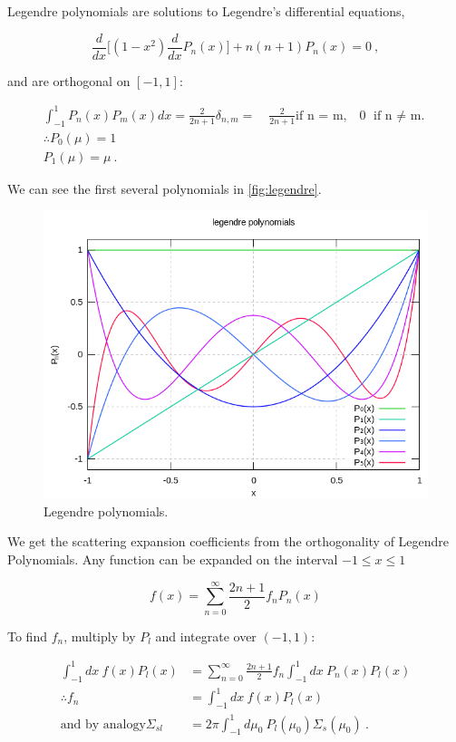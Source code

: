 \documentclass[12pt]{article}
\begin{document}
Legendre polynomials are solutions to Legendre's differential equations,

\[\frac{d}{dx}\bigl[(1 - x^2) \frac{d}{dx} P_n(x) \bigr] +
n(n+1)P_n(x) = 0\:,\]

and are orthogonal on $[-1,1]$:

\begin{gather*}
\int_{-1}^{1}P_n(x)P_m(x)dx = 
\frac{2}{2n+1}\delta_{n,m}= \quad\frac{2}{2n+1}\text{if n = m,} 
\quad 0\text{ if n $\neq$ m.}\\
\therefore P_0(\mu) = 1 \\
P_1(\mu) = \mu\:.
\end{gather*}

We can see the first several polynomials in \autoref{fig:legendre}.

\begin{figure}[h!]
    \begin{center}
    \includegraphics[keepaspectratio, width = 3.5 in]{Legendrepolynomials}
    \end{center}
    \caption{Legendre polynomials.}
    \label{fig:legendre}
\end{figure}

We get the scattering expansion coefficients from the orthogonality of
Legendre Polynomials. Any function can be expanded on the interval
$-1 \leq x \leq 1$

\[
f(x) = \sum_{n=0}^{\infty} \frac{2n+1}{2} f_n P_n(x)
\]

To find $f_n$, multiply by $P_l$ and integrate over $(-1,1)$:

\begin{align*}
\int_{-1}^1 dx\: f(x) P_l(x) &=
\sum_{n=0}^{\infty} \frac{2n+1}{2} f_n\int_{-1}^1 dx\:  P_n(x) P_l(x)\\
\therefore f_n &= \int_{-1}^1 dx\: f(x) P_l(x)\\
\text{and by analogy}\Sigma_{sl} &=
2\pi \int_{-1}^1 d\mu_0 \: P_l(\mu_0)\Sigma_s(\mu_0)\:.
\end{align*}
\end{document}
